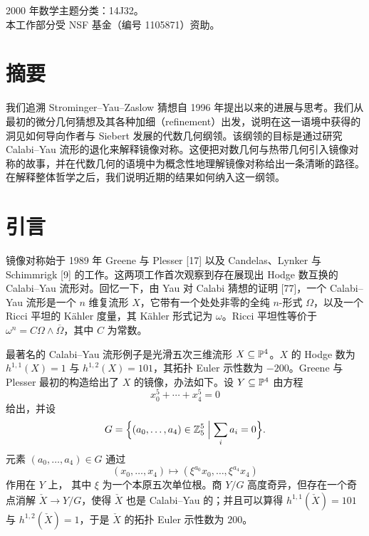 \begin{center}\small
2000 年数学主题分类：14J32。\\
本工作部分受 NSF 基金（编号 1105871）资助。
\end{center}

\section*{摘要}
我们追溯 Strominger--Yau--Zaslow 猜想自 1996 年提出以来的进展与思考。我们从最初的微分几何猜想及其各种加细（refinement）出发，说明在这一语境中获得的洞见如何导向作者与 Siebert 发展的代数几何纲领。该纲领的目标是通过研究 Calabi--Yau 流形的退化来解释镜像对称。这便把对数几何与热带几何引入镜像对称的故事，并在代数几何的语境中为概念性地理解镜像对称给出一条清晰的路径。在解释整体哲学之后，我们说明近期的结果如何纳入这一纲领。

\section*{引言}
镜像对称始于 1989 年 Greene 与 Plesser [17] 以及 Candelas、Lynker 与 Schimmrigk [9] 的工作。这两项工作首次观察到存在展现出 Hodge 数互换的 Calabi--Yau 流形对。回忆一下，由 Yau 对 Calabi 猜想的证明 [77]，一个 Calabi--Yau 流形是一个 $n$ 维复流形 $X$，它带有一个处处非零的全纯 $n$-形式 $\Omega$，以及一个 Ricci 平坦的 Kähler 度量，其 Kähler 形式记为 $\omega$。Ricci 平坦性等价于 $\omega^n=C\Omega\wedge\overline{\Omega}$，其中 $C$ 为常数。

最著名的 Calabi--Yau 流形例子是光滑五次三维流形 $X\subseteq\mathbb{P}^4$。$X$ 的 Hodge 数为 $h^{1,1}(X)=1$ 与 $h^{1,2}(X)=101$，其拓扑 Euler 示性数为 $-200$。Greene 与 Plesser 最初的构造给出了 $X$ 的镜像，办法如下。设 $Y\subseteq\mathbb{P}^4$ 由方程
\[
x_0^5+\cdots+x_4^5=0
\]
给出，并设
\[
G=\Bigl\{(a_0,\dots,a_4)\in\mathbb{Z}_5^5\Bigm|\sum_i a_i=0\Bigr\}.
\]
元素 $(a_0,\dots,a_4)\in G$ 通过
\[
(x_0,\dots,x_4)\mapsto(\xi^{a_0}x_0,\dots,\xi^{a_4}x_4)
\]
作用在 $Y$ 上，
其中 $\xi$ 为一个本原五次单位根。商 $Y/G$ 高度奇异，但存在一个奇点消解 $\check X\to Y/G$，使得 $\check X$ 也是 Calabi--Yau 的；并且可以算得 $h^{1,1}(\check X)=101$ 与 $h^{1,2}(\check X)=1$，于是 $\check X$ 的拓扑 Euler 示性数为 $200$。

